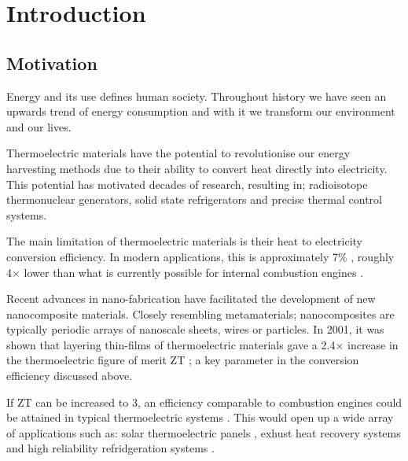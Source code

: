 \documentclass[12pt,draft]{article}
\begin{document}
\pagebreak

\tableofcontents

\pagebreak


\pagestyle{fancy}

\section{Introduction}
 
\subsection{Motivation}
Energy and its use defines human society. Throughout history we have seen an upwards trend of energy consumption and with it we transform our environment and our lives.

Thermoelectric materials have the potential to revolutionise our energy harvesting methods due to their ability to convert heat directly into electricity. This potential has motivated decades of research, resulting in; radioisotope thermonuclear generators, solid state refrigerators and precise thermal control systems.

The main limitation of thermoelectric materials is their heat to electricity conversion efficiency. In modern applications, this is approximately 7\% \cite{modern-thermoelectrics}, roughly 4$\times$ lower than what is currently possible for internal combustion engines \cite{engine-efficiency}.

Recent advances in nano-fabrication have facilitated the development of new nanocomposite materials. Closely resembling metamaterials; nanocomposites are typically periodic arrays of nanoscale sheets, wires or particles. In 2001, it was shown that layering thin-films of thermoelectric materials gave a 2.4$\times$ increase in the thermoelectric figure of merit ZT \cite{nanocomposite-zt}; a key parameter in the conversion efficiency discussed above.

If ZT can be increased to 3, an efficiency comparable to combustion engines could be attained in typical thermoelectric systems \cite{liu-review}. This would open up a wide array of applications such as: solar thermoelectric panels \cite{solar-thermal}, exhust heat recovery systems \cite{exhust-recovery} and high reliability refridgeration systems \cite{thermo-cooling}.
\end{document}
